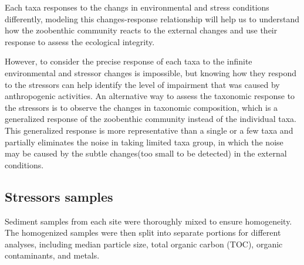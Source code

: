 
Each taxa responses to the changs in environmental and stress conditions differently, modeling this changes-response relationship will 
help us to understand how the zoobenthic community reacts to the external changes and use their response to assess the ecological integrity.

However, to consider the precise response of each taxa to the infinite environmental and stressor changes is impossible, 
but knowing how they respond to the stressors can help identify the level of impairment that
was caused by anthropogenic activities.
An alternative way to assess the taxonomic response to the stressors is to observe the changes in taxonomic composition,
which is a generalized response of the zoobenthic community instead of the individual taxa. This generalized response is more 
representative than a single or a few taxa and partially eliminates the noise in taking limited taxa group, in which the noise may be caused by the 
subtle changes(too small to be detected) in the external conditions.

\subsection{Stressors samples}

Sediment samples from each site were thoroughly mixed to ensure homogeneity. The homogenized samples were then split into separate portions for different analyses, including median particle size, total organic carbon (TOC), organic contaminants, and metals.

